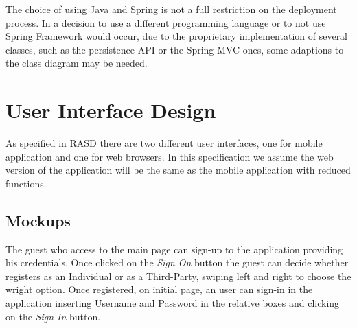 \documentclass[a4paper]{article}
\begin{document}
The choice of using Java and Spring is not a full restriction on the deployment process. In a decision to use a different programming language or to not use Spring Framework would occur, due to the proprietary implementation of several classes, such as the persistence API or the Spring MVC ones, some adaptions to the class diagram may be needed.

\newpage
\section{User Interface Design}
As specified in RASD there are two different user interfaces, one for mobile application and one for web browsers. In this specification we assume the web version of the application will be the same as the mobile application with reduced functions.

\subsection{Mockups}
The guest who access to the main page can sign-up to the application providing his credentials. Once clicked on the \textit{Sign On} button the guest can decide whether registers as an Individual or as a Third-Party, swiping left and right to choose the wright option. Once registered, on initial page, an user can sign-in in the application inserting Username and Password in the relative boxes and clicking on the \textit{Sign In} button. 
\end{document}
